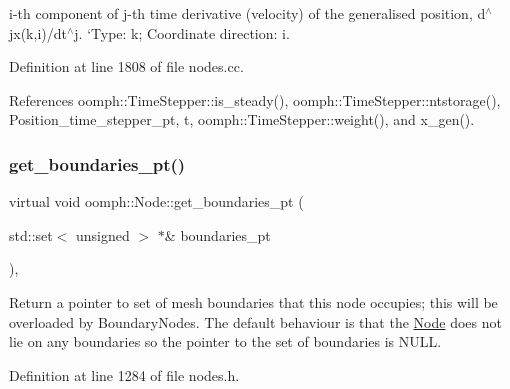 i-\/th component of j-\/th time derivative (velocity) of the generalised position, d$^\wedge$jx(k,i)/dt$^\wedge$j. `\+Type\textquotesingle{}\+: k; Coordinate direction\+: i. 



Definition at line 1808 of file nodes.\+cc.



References oomph\+::\+Time\+Stepper\+::is\+\_\+steady(), oomph\+::\+Time\+Stepper\+::ntstorage(), Position\+\_\+time\+\_\+stepper\+\_\+pt, t, oomph\+::\+Time\+Stepper\+::weight(), and x\+\_\+gen().

\mbox{\label{classoomph_1_1Node_a33092a3d51285282ae8ec8e702d1cbf5}} 
\subsubsection{\texorpdfstring{get\+\_\+boundaries\+\_\+pt()}{get\_boundaries\_pt()}}
{\footnotesize\ttfamily virtual void oomph\+::\+Node\+::get\+\_\+boundaries\+\_\+pt (\begin{DoxyParamCaption}\item[{std\+::set$<$ unsigned $>$ $\ast$\&}]{boundaries\+\_\+pt }\end{DoxyParamCaption})\hspace{0.3cm}{\ttfamily [inline]}, {\ttfamily [virtual]}}



Return a pointer to set of mesh boundaries that this node occupies; this will be overloaded by Boundary\+Nodes. The default behaviour is that the \hyperlink{classoomph_1_1Node}{Node} does not lie on any boundaries so the pointer to the set of boundaries is N\+U\+LL. 



Definition at line 1284 of file nodes.\+h.



